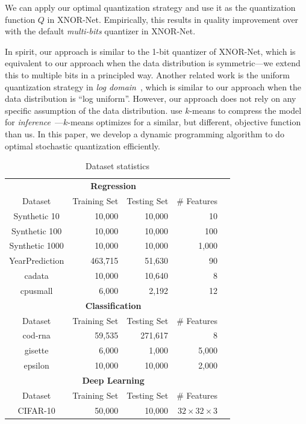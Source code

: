 \documentclass{article}
\begin{document}
We can apply our optimal quantization strategy 
and use it as the quantization function $Q$
in XNOR-Net. Empirically, this results in 
quality improvement
over with the default {\em multi-bits} quantizer in XNOR-Net. 

\vspace{-0.5em}
In spirit, our approach is similar to the 1-bit quantizer of
XNOR-Net, which is equivalent to our approach when the data
distribution is symmetric---we extend this
to multiple bits in a principled way. Another related work
is the uniform quantization strategy 
in {\em log domain}~\cite{miyashita2016convolutional},
which is similar to our approach when the data distribution
is ``log uniform''. However, our approach does not rely on
any specific assumption of the data distribution.
\citet{Han:2016:ICLR} use $k$-means to
compress the model for {\em inference}~---$k$-means
optimizes for a similar, but different, objective
function than us. In this paper, we 
develop a dynamic
programming algorithm to do optimal stochastic quantization efficiently.








\begin{table}[t]
\scriptsize
\centering
\begin{tabular}{crrrr}
\hline
\multicolumn{4}{c}{\bf Regression}\\
Dataset           & Training Set & Testing Set & \# Features  \\
\hline
Synthetic 10   & 10,000        & 10,000       & 10               \\
Synthetic 100  & 10,000        & 10,000       & 100              \\
Synthetic 1000 & 10,000        & 10,000       & 1,000           \\
YearPrediction & 463,715       & 51,630       & 90                  \\
cadata         & 10,000        & 10,640       & 8                   \\
cpusmall       & 6,000         & 2,192        & 12     \\
\hline
\hline
\multicolumn{4}{c}{\bf Classification}\\
Dataset           & Training Set & Testing Set & \# Features \\
\hline
cod-rna        & 59,535        & 271,617      & 8    \\
gisette        & 6,000         & 1,000        & 5,000  \\  
epsilon        & 10,000        & 10,000       & 2,000\\  
\hline
\hline
\multicolumn{4}{c}{\bf Deep Learning}\\
Dataset           & Training Set & Testing Set & \# Features \\
\hline
CIFAR-10        & 50,000        & 10,000      &$32\times 32\times 3$     \\
\hline
\end{tabular}
\caption{Dataset statistics}
\label{table:dataset}
\end{table}
\end{document}
